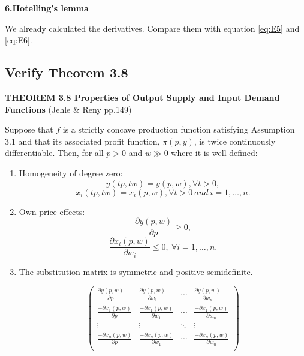 \documentclass{article}
\begin{document}
\vspace{3mm}
\textbf{6.Hotelling's lemma}

We already calculated the derivatives. Compare them with equation \ref{eq:E5} and \ref{eq:E6}.
\subsection{Verify Theorem 3.8}

\begin{mdframed}[backgroundcolor=blue!20,linecolor=white]

\textbf{THEOREM 3.8 Properties of Output Supply and Input Demand Functions} (Jehle \& Reny pp.149)

Suppose that $f$ is a strictly concave production function satisfying Assumption 3.1 and that its associated profit function, $\pi(p, y)$, is twice continuously differentiable. Then, for all $p > 0$ and $w \gg 0$ where it is well defined:

\begin{enumerate}

\item Homogeneity of degree zero:
$$y(tp,tw) = y (p,w), \forall t > 0,$$
$$x_i(tp,tw) = x_i(p,w), \forall t > 0 \ and \  i = 1,\dots, n.$$
\item Own-price effects:
$$\frac{\partial y(p,w)}{\partial p} \ge 0,$$
$$\frac{\partial x_i(p,w)}{\partial w_i} \le 0, \ \forall i = 1,\dots, n. $$

\item The substitution matrix is symmetric and positive semidefinite.

\begin{equation}
\left(
    \begin{array}{cccc}
    \frac{\partial y(p,w)}{\partial p} & \frac{\partial y(p,w)}{\partial w_1} & \cdots & \frac{\partial y(p,w)}{\partial w_n} \\
    \frac{-\partial x_1(p,w)}{\partial p} & \frac{-\partial x_1(p,w)}{\partial w_1} & \cdots & \frac{-\partial x_1(p,w)}{\partial w_n} \\
    \vdots    &    \vdots & \ddots &   \vdots \\
    \frac{-\partial x_n(p,w)}{\partial p} & \frac{-\partial x_n(p,w)}{\partial w_1} & \cdots & \frac{-\partial x_n(p,w)}{\partial w_n} \\
    \end{array}
    \right)
\label{eq:subst}   
\end{equation}
\end{enumerate}
\end{mdframed}
\end{document}
